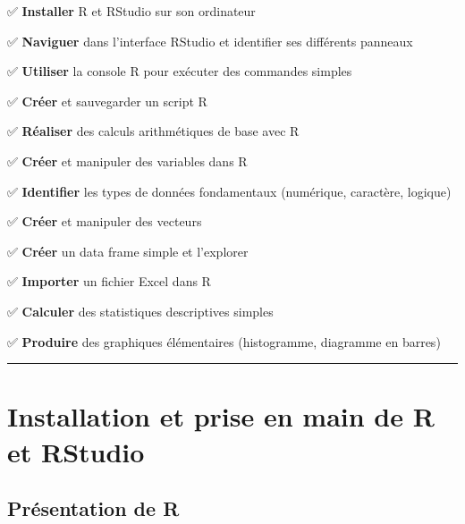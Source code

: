 \documentclass[
  french,
  11pt,
  a4paper,
]{article}
\begin{document}
\begin{tcolorbox}[enhanced jigsaw, arc=.35mm, bottomrule=.15mm, bottomtitle=1mm, breakable, colback=white, colbacktitle=quarto-callout-note-color!10!white, colframe=quarto-callout-note-color-frame, coltitle=black, left=2mm, leftrule=.75mm, opacityback=0, opacitybacktitle=0.6, rightrule=.15mm, title=\textcolor{quarto-callout-note-color}{\faInfo}\hspace{0.5em}{Compétences visées}, titlerule=0mm, toprule=.15mm, toptitle=1mm]

✅ \textbf{Installer} R et RStudio sur son ordinateur

✅ \textbf{Naviguer} dans l'interface RStudio et identifier ses
différents panneaux

✅ \textbf{Utiliser} la console R pour exécuter des commandes simples

✅ \textbf{Créer} et sauvegarder un script R

✅ \textbf{Réaliser} des calculs arithmétiques de base avec R

✅ \textbf{Créer} et manipuler des variables dans R

✅ \textbf{Identifier} les types de données fondamentaux (numérique,
caractère, logique)

✅ \textbf{Créer} et manipuler des vecteurs

✅ \textbf{Créer} un data frame simple et l'explorer

✅ \textbf{Importer} un fichier Excel dans R

✅ \textbf{Calculer} des statistiques descriptives simples

✅ \textbf{Produire} des graphiques élémentaires (histogramme, diagramme
en barres)

\end{tcolorbox}

\begin{center}\rule{0.5\linewidth}{0.5pt}\end{center}

\section{Installation et prise en main de R et
RStudio}\label{installation-et-prise-en-main-de-r-et-rstudio}

\subsection{Présentation de R}\label{pruxe9sentation-de-r}
\end{document}

